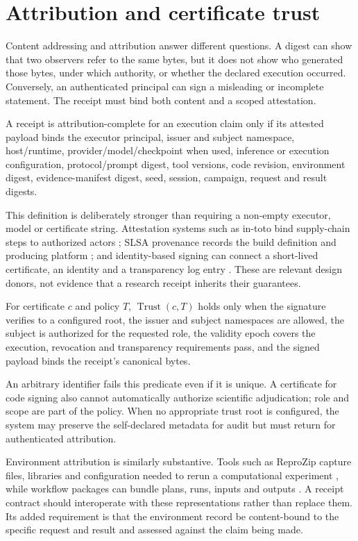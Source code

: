 \section{Attribution and certificate trust}

Content addressing and attribution answer different questions. A digest can show
that two observers refer to the same bytes, but it does not show who generated
those bytes, under which authority, or whether the declared execution occurred.
Conversely, an authenticated principal can sign a misleading or incomplete
statement. The receipt must bind both content and a scoped attestation.

\begin{definition}
A receipt is attribution-complete for an execution claim only if its attested
payload binds the executor principal, issuer and subject namespace, host/runtime,
provider/model/checkpoint when used, inference or execution configuration,
protocol/prompt digest, tool versions, code revision, environment digest,
evidence-manifest digest, seed, session, campaign, request and result digests.
\end{definition}

This definition is deliberately stronger than requiring a non-empty executor,
model or certificate string. Attestation systems such as in-toto bind supply-chain
steps to authorized actors \citep{torresarias2019intoto}; SLSA provenance records
the build definition and producing platform \citep{slsa2026provenance}; and
identity-based signing can connect a short-lived certificate, an identity and a
transparency log entry \citep{sigstore2026signing}. These are relevant design
donors, not evidence that a research receipt inherits their guarantees.

\begin{definition}
For certificate $c$ and policy $T$, $\operatorname{Trust}(c,T)$ holds only when
the signature verifies to a configured root, the issuer and subject namespaces are
allowed, the subject is authorized for the requested role, the validity epoch
covers the execution, revocation and transparency requirements pass, and the
signed payload binds the receipt's canonical bytes.
\end{definition}

An arbitrary identifier fails this predicate even if it is unique. A certificate
for code signing also cannot automatically authorize scientific adjudication; role
and scope are part of the policy. When no appropriate trust root is configured,
the system may preserve the self-declared metadata for audit but must return
\cannotcheck{} for authenticated attribution.

Environment attribution is similarly substantive. Tools such as ReproZip capture
files, libraries and configuration needed to rerun a computational experiment
\citep{chirigati2016reprozip}, while workflow packages can bundle plans, runs,
inputs and outputs \citep{khan2019cwlprov,leo2024workflowrun}. A receipt contract
should interoperate with these representations rather than replace them. Its added
requirement is that the environment record be content-bound to the specific request
and result and assessed against the claim being made.


